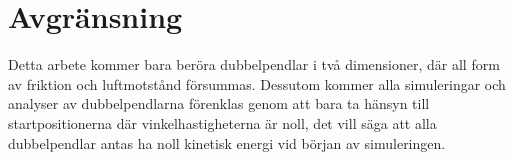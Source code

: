 \section{Avgränsning}
Detta arbete kommer bara beröra dubbelpendlar i två dimensioner, där all form av friktion och luftmotstånd försummas. Dessutom kommer alla simuleringar och analyser av dubbelpendlarna förenklas genom att bara ta hänsyn till startpositionerna där vinkelhastigheterna är noll, det vill säga att alla dubbelpendlar antas ha noll kinetisk energi vid början av simuleringen.  



